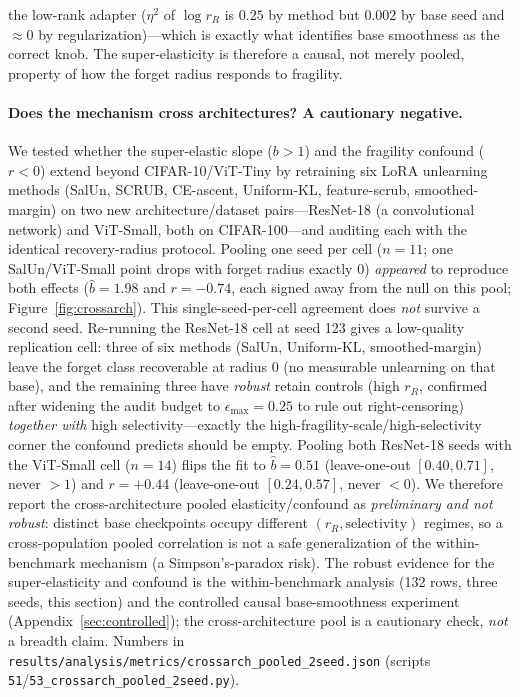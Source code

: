 \documentclass[11pt]{article}
\begin{document}
the low-rank adapter ($\eta^2$ of $\log r_R$ is $0.25$ by method but $0.002$ by base seed and $\approx 0$ by regularization)---which is exactly what identifies base smoothness as the correct knob. The super-elasticity is therefore a causal, not merely pooled, property of how the forget radius responds to fragility.

\paragraph{Does the mechanism cross architectures? A cautionary negative.} We tested whether the super-elastic slope ($b>1$) and the fragility confound ($r<0$) extend beyond CIFAR-10/ViT-Tiny by retraining six LoRA unlearning methods (SalUn, SCRUB, CE-ascent, Uniform-KL, feature-scrub, smoothed-margin) on two new architecture/dataset pairs---ResNet-18 (a convolutional network) and ViT-Small, both on CIFAR-100---and auditing each with the identical recovery-radius protocol. Pooling one seed per cell ($n=11$; one SalUn/ViT-Small point drops with forget radius exactly $0$) \emph{appeared} to reproduce both effects ($\hat b=1.98$ and $r=-0.74$, each signed away from the null on this pool; Figure~\ref{fig:crossarch}). This single-seed-per-cell agreement does \emph{not} survive a second seed. Re-running the ResNet-18 cell at seed 123 gives a low-quality replication cell: three of six methods (SalUn, Uniform-KL, smoothed-margin) leave the forget class recoverable at radius $0$ (no measurable unlearning on that base), and the remaining three have \emph{robust} retain controls (high $r_R$, confirmed after widening the audit budget to $\epsilon_{\max}=0.25$ to rule out right-censoring) \emph{together with} high selectivity---exactly the high-fragility-scale/high-selectivity corner the confound predicts should be empty. Pooling both ResNet-18 seeds with the ViT-Small cell ($n=14$) flips the fit to $\hat b=0.51$ (leave-one-out $[0.40,0.71]$, never $>1$) and $r=+0.44$ (leave-one-out $[0.24,0.57]$, never $<0$). We therefore report the cross-architecture pooled elasticity/confound as \emph{preliminary and not robust}: distinct base checkpoints occupy different $(r_R,\text{selectivity})$ regimes, so a cross-population pooled correlation is not a safe generalization of the within-benchmark mechanism (a Simpson's-paradox risk). The robust evidence for the super-elasticity and confound is the within-benchmark analysis (132 rows, three seeds, this section) and the controlled causal base-smoothness experiment (Appendix~\ref{sec:controlled}); the cross-architecture pool is a cautionary check, \emph{not} a breadth claim. Numbers in \texttt{results/analysis/metrics/crossarch\_pooled\_2seed.json} (scripts \texttt{51}/\texttt{53\_crossarch\_pooled\_2seed.py}).
\end{document}
